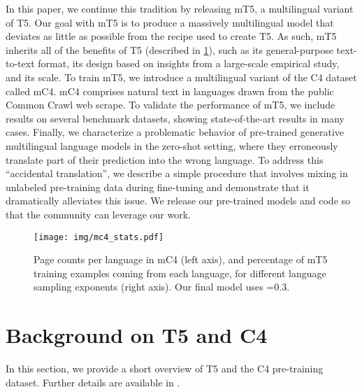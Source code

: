 \documentclass[11pt]{article}
\begin{document}
In this paper, we continue this tradition by releasing mT5, a multilingual variant of T5.
Our goal with mT5 is to produce a massively multilingual model that deviates as little as possible from the recipe used to create T5.
As such, mT5 inherits all of the benefits of T5 (described in \cref{sec:t5}), such as its general-purpose text-to-text format, its design based on insights from a large-scale empirical study, and its scale.
To train mT5, we introduce a multilingual variant of the C4 dataset called mC4.
mC4 comprises natural text in  languages drawn from the public Common Crawl web scrape.
To validate the performance of mT5, we include results on several benchmark datasets, showing state-of-the-art results in many cases.
Finally, we characterize a problematic behavior of pre-trained generative multilingual language models in the zero-shot setting, where they erroneously translate part of their prediction into the wrong language.
To address this ``accidental translation'', we describe a simple procedure that involves mixing in unlabeled pre-training data during fine-tuning and demonstrate that it dramatically alleviates this issue.
We release our pre-trained models and code so that the community can leverage our work.\footnotemark[1]



\begin{figure*}
\centering
\texttt{[image: img/mc4\_stats.pdf]}
\caption{Page counts per language in mC4 (left axis), and percentage of mT5 training examples coming from each language, for different language sampling exponents  (right axis). Our final model uses =0.3.}
\label{fig:corpus_stats}
\end{figure*}

\section{Background on T5 and C4}
\label{sec:t5}

In this section, we provide a short overview of T5 and the C4 pre-training dataset.
Further details are available in \citet{2020t5}.
\end{document}
